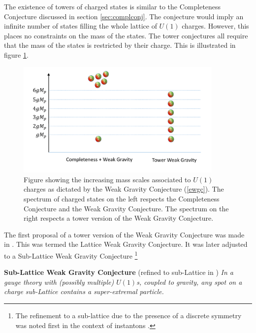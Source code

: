 \documentclass[11pt,a4paper]{article}
\numberwithin{equation}{section}
\numberwithin{table}{section}\setlength{\multlinegap}{25pt}
\begin{document}
The existence of towers of charged states is similar to the Completeness Conjecture discussed in section \ref{sec:complconj}. The conjecture would imply an infinite number of states filling the whole lattice of $U(1)$ charges. However, this places no constraints on the mass of the states. The tower conjectures all require that the mass of the states is restricted by their charge. This is illustrated in figure \ref{fig:two}.  
\begin{figure}[t]
\centering
 \includegraphics[width=0.9\textwidth]{FigTow.pdf}
\caption{Figure showing the increasing mass scales associated to $U(1)$ charges as dictated by the Weak Gravity Conjecture (\ref{ewgc}). The spectrum of charged states on the left respects the Completeness Conjecture and the Weak Gravity Conjecture. The spectrum on the right respects a tower version of the Weak Gravity Conjecture.}
\label{fig:two}
\end{figure}

The first proposal of a tower version of the Weak Gravity Conjecture was made in \cite{Heidenreich:2015nta}. This was termed the Lattice Weak Gravity Conjecture. It was later adjusted to a Sub-Lattice Weak Gravity Conjecture \cite{Montero:2016tif,Heidenreich:2016aqi}\footnote{The refinement to a sub-lattice due to the presence of a discrete symmetry was noted first in the context of instantons \cite{Montero:2015ofa,Brown:2015lia}.}
\begin{tcolorbox}
{\bf Sub-Lattice Weak Gravity Conjecture } \;\cite{Heidenreich:2015nta} \;\; (refined to sub-Lattice in \cite{Montero:2016tif,Heidenreich:2016aqi})
{\it 
\newline
\newline
In a gauge theory with (possibly multiple) $U(1)$s, coupled to gravity, any spot on a charge sub-Lattice contains a super-extremal particle.
}
\end{tcolorbox}
\end{document}
